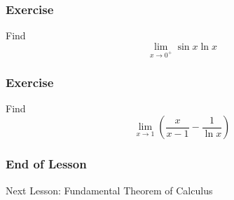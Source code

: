 \documentclass[xcolor=dvipsnames]{beamer}
\begin{document}
\begin{frame}
  \frametitle{Exercise}
  {\ubung} Find
  \begin{equation}
    \label{eq:eemeeyae}
    \lim_{x\rightarrow{}0^{+}}\sin{}x\ln{}x
  \end{equation}
\end{frame}

\begin{frame}
  \frametitle{Exercise}
  {\ubung} Find
  \begin{equation}
    \label{eq:gasuchoh}
    \lim_{x\rightarrow{}1}\left(\frac{x}{x-1}-\frac{1}{\ln{}x}\right)
  \end{equation}
\end{frame}

\begin{frame}
  \frametitle{End of Lesson}
Next Lesson: Fundamental Theorem of Calculus
\end{frame}
\end{document}
